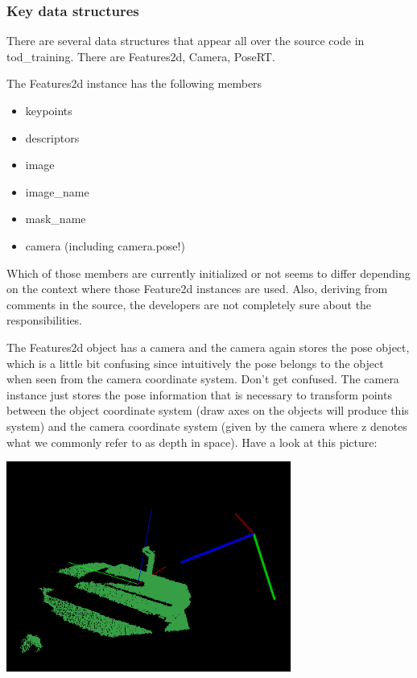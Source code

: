 \subsubsection*{Key data structures}

There are several data structures that appear all over the source code in
tod\_training. There are Features2d, Camera, PoseRT.

The Features2d instance has the following members
\begin{itemize}
    \item keypoints
    \item descriptors
    \item image
    \item image\_name
    \item mask\_name
    \item camera (including camera.pose!)
\end{itemize}

Which of those members are currently initialized or not seems to differ
depending on the context where those Feature2d instances are used. Also,
deriving from comments in the source, the developers are not completely sure
about the responsibilities.

The Features2d object has a camera and the camera again stores the pose object,
which is a little bit confusing since intuitively the pose belongs to the
object when seen from the camera coordinate system. Don't get confused. The
camera instance just stores the pose information that is necessary to transform
points between the object coordinate system (draw axes on the objects will
produce this system) and the camera coordinate system (given by the camera
where z denotes what we commonly refer to as depth in space). Have a look at
this picture:

\includegraphics[width=0.7\textwidth]{../doc/pose.png}

